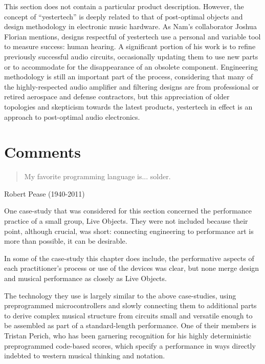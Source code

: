 This section does not contain a particular product description. However, the concept of ``yestertech'' is deeply related to that of post-optimal objects and design methodology in electronic music hardware. As Nam's collaborator Joshua Florian mentions, designs respectful of yestertech use a personal and variable tool to measure success: human hearing. A significant portion of his work is to refine previously successful audio circuits, occasionally updating them to use new parts or to accommodate for the disappearance of an obsolete component. Engineering methodology is still an important part of the process, considering that many of the highly-respected audio amplifier and filtering designs are from professional or retired aerospace and defense contractors, but  this appreciation of older topologies and skepticism towards the latest products, yestertech in effect is an approach to post-optimal audio electronics. 

\section{Comments}

\begin{quote}
	
	My favorite programming language is... solder. 
	
	\end{quote}
	
	Robert Pease (1940-2011)

One case-study that was considered for this section concerned the performance practice of a small group, Live Objects. They were not included because their point, although crucial, was short: connecting engineering to performance art is more than possible, it can be desirable. 

In some of the case-study this chapter does include, the performative aspects of each practitioner's process or use of the devices was clear, but none merge design and musical performance as closely as Live Objects. 

The technology they use is largely similar to the above case-studies, using preprogrammed microcontrollers and slowly connecting them to additional parts to derive complex musical structure from circuits small and versatile enough to be assembled as part of a standard-length performance. One of their members is Tristan Perich, who has been garnering recognition for his highly deterministic preprogrammed code-based scores, which specify a performance in ways directly indebted to western musical thinking and notation. 

